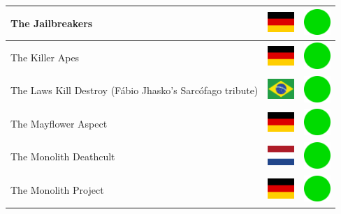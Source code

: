 \documentclass[12pt, a4paper, twoside]{report}
\begin{document}
\begin{center}
\begin{longtable}{|p{5cm}|p{2cm}|p{2cm}|}
 The Jailbreakers                                           & \includegraphics[width=1cm]{../4x3/de} &   \includegraphics[width=1cm]{../likes/y} \\ \hline
 The Killer Apes                                            & \includegraphics[width=1cm]{../4x3/de} &   \includegraphics[width=1cm]{../likes/y} \\ \hline
 The Laws Kill Destroy (Fábio Jhasko's Sarcófago tribute)   & \includegraphics[width=1cm]{../4x3/br} &   \includegraphics[width=1cm]{../likes/y} \\ \hline
 The Mayflower Aspect                                       & \includegraphics[width=1cm]{../4x3/de} &   \includegraphics[width=1cm]{../likes/y} \\ \hline
 The Monolith Deathcult                                     & \includegraphics[width=1cm]{../4x3/nl} &   \includegraphics[width=1cm]{../likes/y} \\ \hline
 The Monolith Project                                       & \includegraphics[width=1cm]{../4x3/de} &   \includegraphics[width=1cm]{../likes/y} \\ \hline

\end{longtable}
\end{center}
\end{document}
